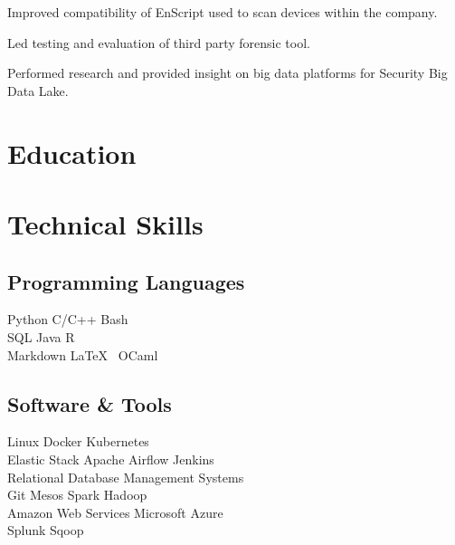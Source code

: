 \documentclass[]{deedy-resume-openfont}
\begin{document}
\vspace{\topsep} 
\begin{tightemize}
\item Improved compatibility of EnScript used to scan devices within the company.
\item Led testing and evaluation of third party forensic tool.
\item Performed research and provided insight on big data platforms for Security Big Data Lake.
\end{tightemize}
\sectionsep


\section{Education}
\sectionsep


\section{Technical Skills}
\begin{minipage}[t]{.6\textwidth}
\subsection{Programming Languages}
Python \textbullet{}   C/C++ \textbullet{} Bash \\
SQL \textbullet{} Java \textbullet{} R \\
Markdown \textbullet{} \LaTeX\ \textbullet{} OCaml \\
\sectionsep
\end{minipage}
\hfill
\begin{minipage}[t]{.35\textwidth}
\subsection{Software \& Tools}
Linux \textbullet{} Docker \textbullet{} Kubernetes\\
Elastic Stack \textbullet{} Apache Airflow \textbullet{} Jenkins\\
Relational Database Management Systems\\
Git \textbullet{} Mesos \textbullet{} Spark \textbullet{} Hadoop\\
Amazon Web Services \textbullet{} Microsoft Azure\\
Splunk  \textbullet{} Sqoop\\
\end{minipage}
\end{document}
